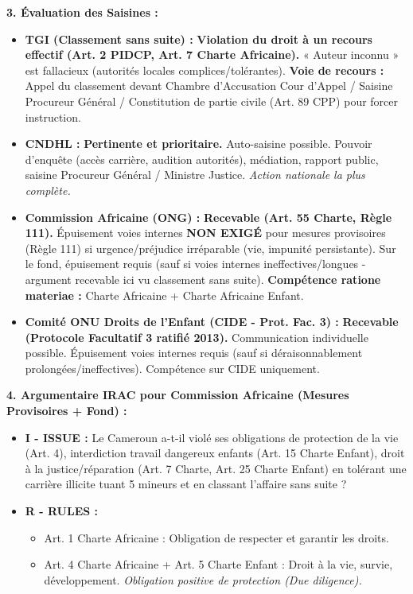 \documentclass[11pt]{article}
\begin{document}
\begin{exoresolu}
\begin{enumerate}
    \end{enumerate}
    \textbf{3. Évaluation des Saisines :}
    \begin{itemize}
        \item \textbf{TGI (Classement sans suite) :} \textbf{Violation du droit à un recours effectif (Art. 2 PIDCP, Art. 7 Charte Africaine).} « Auteur inconnu » est fallacieux (autorités locales complices/tolérantes). \textbf{Voie de recours :} Appel du classement devant Chambre d'Accusation Cour d'Appel / Saisine Procureur Général / Constitution de partie civile (Art. 89 CPP) pour forcer instruction.
        \item \textbf{CNDHL :} \textbf{Pertinente et prioritaire.} Auto-saisine possible. Pouvoir d'enquête (accès carrière, audition autorités), médiation, rapport public, saisine Procureur Général / Ministre Justice. \emph{Action nationale la plus complète.}
        \item \textbf{Commission Africaine (ONG) :} \textbf{Recevable (Art. 55 Charte, Règle 111).} Épuisement voies internes \textbf{NON EXIGÉ} pour mesures provisoires (Règle 111) si urgence/préjudice irréparable (vie, impunité persistante). Sur le fond, épuisement requis (sauf si voies internes ineffectives/longues - argument recevable ici vu classement sans suite). \textbf{Compétence ratione materiae :} Charte Africaine + Charte Africaine Enfant.
        \item \textbf{Comité ONU Droits de l'Enfant (CIDE - Prot. Fac. 3) :} \textbf{Recevable (Protocole Facultatif 3 ratifié 2013).} Communication individuelle possible. Épuisement voies internes requis (sauf si déraisonnablement prolongées/ineffectives). Compétence sur CIDE uniquement.
    \end{itemize}
    \textbf{4. Argumentaire IRAC pour Commission Africaine (Mesures Provisoires + Fond) :}
    \begin{itemize}
        \item \textbf{I - ISSUE :} Le Cameroun a-t-il violé ses obligations de protection de la vie (Art. 4), interdiction travail dangereux enfants (Art. 15 Charte Enfant), droit à la justice/réparation (Art. 7 Charte, Art. 25 Charte Enfant) en tolérant une carrière illicite tuant 5 mineurs et en classant l'affaire sans suite ?
        \item \textbf{R - RULES :}
            \begin{itemize}
                \item Art. 1 Charte Africaine : Obligation de respecter et garantir les droits.
                \item Art. 4 Charte Africaine + Art. 5 Charte Enfant : Droit à la vie, survie, développement. \emph{Obligation positive de protection (Due diligence).}

\end{itemize}
\end{itemize}
\end{exoresolu}
\end{document}
